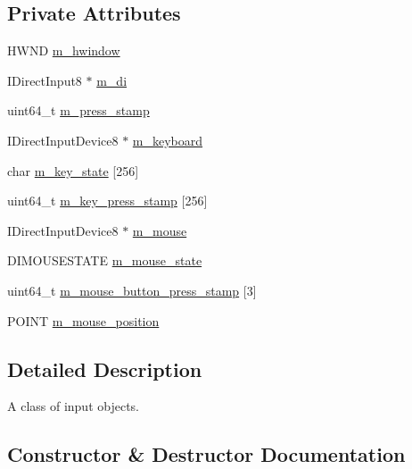 \subsection*{Private Attributes}
\begin{DoxyCompactItemize}
\item 
H\+W\+ND \hyperlink{classmage_1_1_input_a1b33f0e27c18870391633b1883c3f615}{m\+\_\+hwindow}
\item 
I\+Direct\+Input8 $\ast$ \hyperlink{classmage_1_1_input_a6169d17f5a782039c7aefd0ffc5ba1bf}{m\+\_\+di}
\item 
uint64\+\_\+t \hyperlink{classmage_1_1_input_a30ac0d05616daa4211b59d680fae6d76}{m\+\_\+press\+\_\+stamp}
\item 
I\+Direct\+Input\+Device8 $\ast$ \hyperlink{classmage_1_1_input_a18ffc2becd62b77e9c4830e92cdf9999}{m\+\_\+keyboard}
\item 
char \hyperlink{classmage_1_1_input_aa0f92d1f06d3f952611ccdb69c9da1d4}{m\+\_\+key\+\_\+state} \mbox{[}256\mbox{]}
\item 
uint64\+\_\+t \hyperlink{classmage_1_1_input_a383109c45d2a0b0edeb482de8b53d53b}{m\+\_\+key\+\_\+press\+\_\+stamp} \mbox{[}256\mbox{]}
\item 
I\+Direct\+Input\+Device8 $\ast$ \hyperlink{classmage_1_1_input_ab62252cea073f7f0fae71ad4cb76a288}{m\+\_\+mouse}
\item 
D\+I\+M\+O\+U\+S\+E\+S\+T\+A\+TE \hyperlink{classmage_1_1_input_a14b8cf407e86724f900d2c4385461cfc}{m\+\_\+mouse\+\_\+state}
\item 
uint64\+\_\+t \hyperlink{classmage_1_1_input_accf558cd7da26ec27b24fde21627a07e}{m\+\_\+mouse\+\_\+button\+\_\+press\+\_\+stamp} \mbox{[}3\mbox{]}
\item 
P\+O\+I\+NT \hyperlink{classmage_1_1_input_a28b8ec250a8d0d0efe0da713060b8599}{m\+\_\+mouse\+\_\+position}
\end{DoxyCompactItemize}


\subsection{Detailed Description}
A class of input objects. 

\subsection{Constructor \& Destructor Documentation}
\hypertarget{classmage_1_1_input_a036b38f787b45d14ff92f360303b33af}{}\label{classmage_1_1_input_a036b38f787b45d14ff92f360303b33af} 
